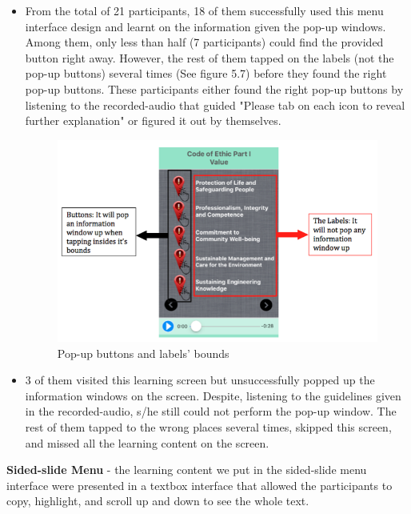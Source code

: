 \begin{itemize} 
\item From the total of 21 participants, 18 of them successfully used this menu interface design and learnt on the information given the pop-up windows. Among them, only less than half (7 participants) could find the provided button right away. However, the rest of them tapped on the labels (not the pop-up buttons) several times (See figure 5.7) before they found the right pop-up buttons. These participants either found the right pop-up buttons by listening to the recorded-audio that guided "Please tab on each icon to reveal further explanation" or figured it out by themselves. 

\begin{figure}[H]
\centering
\includegraphics[width=1 \textwidth]{p1ql1}
\caption{Pop-up buttons and labels' bounds}
\end{figure}

\item 3 of them visited this learning screen but unsuccessfully popped up the information windows on the screen. Despite, listening to the guidelines given in the recorded-audio, s/he still could not perform the pop-up window. The rest of them tapped to the wrong places several times, skipped this screen, and missed all the learning content on the screen. 

\end{itemize} 

 


\noindent\textbf{Sided-slide Menu} - the learning content we put in the sided-slide menu interface were presented in a textbox interface that allowed the participants to copy, highlight, and scroll up and down to see the whole text.

